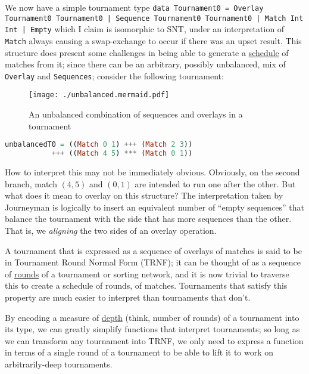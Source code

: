\documentclass[a4,11pt,twoside,final,hidelinks]{article}
\begin{document}
We now have a simple tournament type \texttt{data Tournament0 = Overlay Tournament0
Tournament0 | Sequence Tournament0 Tournament0 | Match Int Int | Empty} which I
claim is isomorphic to SNT, under an interpretation of \texttt{Match} always causing a
swap-exchange to occur if there was an upset result. This structure does present
some challenges in being able to generate a \uline{schedule} of matches from it; since
there can be an arbitrary, possibly unbalanced, mix of \texttt{Overlay} and
\texttt{Sequences}; consider the following tournament:

\begin{figure}[htbp]
\centering
\texttt{[image: ./unbalanced.mermaid.pdf]}
\caption{\label{unbalancedt0}An unbalanced combination of sequences and overlays in a tournament}
\end{figure}

\begin{lstlisting}[language=haskell,numbers=none]
unbalancedT0 = ((Match 0 1) +++ (Match 2 3))
           +++ ((Match 4 5) *** (Match 0 1))
\end{lstlisting}

How to interpret this may not be immediately obvious. Obviously, on the second
branch, match \((4,5)\) and \((0,1)\) are intended to run one after the other. But
what does it mean to overlay on this structure? The interpretation taken by
Journeyman is logically to insert an equivalent number of ``empty sequences'' that
balance the tournament with the side that has more sequences than the other.
That is, we \emph{aligning} the two sides of an overlay operation.

\begin{figure}[H]
\hfill
\hspace*{-2cm}
\hfill
{}
\hfill
\end{figure}

A tournament that is expressed as a sequence of overlays of matches is said to
be in Tournament Round Normal Form (TRNF); it can be thought of as a sequence of
\uline{rounds} of a tournament or sorting network, and it is now trivial to traverse
this to create a schedule of rounds, of matches. Tournaments that satisfy this
property are much easier to interpret than tournaments that don't.

By encoding a measure of \uline{depth} (think, number of rounds) of a tournament into
its type, we can greatly simplify functions that interpret tournaments; so long
as we can transform any tournament into TRNF, we only need to express a function
in terms of a single round of a tournament to be able to lift it to work on
arbitrarily-deep tournaments.
\end{document}
